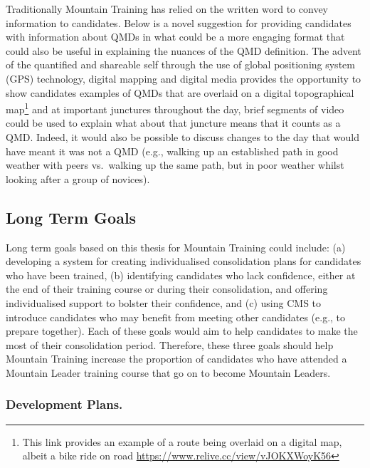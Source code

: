 \documentclass[
  12pt,
  a4paper,
]{book}
\begin{document}
Traditionally Mountain Training has relied on the written word to convey information to candidates. Below is a novel suggestion for providing candidates with information about QMDs in what could be a more engaging format that could also be useful in explaining the nuances of the QMD definition. The advent of the quantified and shareable self through the use of global positioning system (GPS) technology, digital mapping and digital media provides the opportunity to show candidates examples of QMDs that are overlaid on a digital topographical map\footnote{This link provides an example of a route being overlaid on a digital map, albeit a bike ride on road \url{https://www.relive.cc/view/vJOKXWoyK56}} and at important junctures throughout the day, brief segments of video could be used to explain what about that juncture means that it counts as a QMD. Indeed, it would also be possible to discuss changes to the day that would have meant it was not a QMD (e.g., walking up an established path in good weather with peers vs.~walking up the same path, but in poor weather whilst looking after a group of novices).

\hypertarget{long-term-goals}{%
\subsection{Long Term Goals}\label{long-term-goals}}

Long term goals based on this thesis for Mountain Training could include: (a) developing a system for creating individualised consolidation plans for candidates who have been trained, (b) identifying candidates who lack confidence, either at the end of their training course or during their consolidation, and offering individualised support to bolster their confidence, and (c) using CMS to introduce candidates who may benefit from meeting other candidates (e.g., to prepare together). Each of these goals would aim to help candidates to make the most of their consolidation period. Therefore, these three goals should help Mountain Training increase the proportion of candidates who have attended a Mountain Leader training course that go on to become Mountain Leaders.

\hypertarget{development-plans.}{%
\subsubsection{Development Plans.}\label{development-plans.}}
\end{document}
